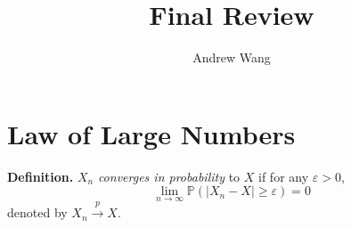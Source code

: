\documentclass{article}
\title{Final Review}
\author{Andrew Wang}
\begin{document}
\maketitle
 
\section{Law of Large Numbers}

\textbf{Definition.} $X_n$ \emph{converges in probability} to $X$ if
                     for any $\varepsilon > 0$,
                     $$\lim_{n \to \infty}\mathbb{P}(|X_n-X| \geq \varepsilon) = 0 $$
                     denoted by $X_n \xrightarrow{p} X $.
\end{document}
